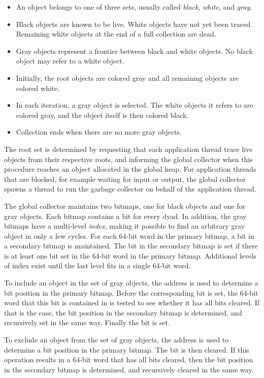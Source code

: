 \begin{itemize}
\item An object belongs to one of three sets, usually called
  \emph{black}, \emph{white}, and \emph{gray}.
\item Black objects are known to be live.  White objects have not yet
  been traced.  Remaining white objects at the end of a full
  collection are dead.
\item Gray objects represent a frontier between black and white
  objects.  No black object may refer to a white object.
\item Initially, the root objects are colored gray and all remaining
  objects are colored white.
\item In each iteration, a gray object is selected.  The white objects
  it refers to are colored gray, and the object itself is then colored
  black.
\item Collection ends when there are no more gray objects.
\end{itemize}

The root set is determined by requesting that each application thread
trace live objects from their respective roots, and informing the
global collector when this procedure reaches an object allocated in
the global heap. For application threads that are blocked, for example
waiting for input or output, the global collector spawns a thread to
run the garbage collector on behalf of the application thread.

The global collector maintains two bitmaps, one for black objects and
one for gray objects.  Each bitmap contains a bit for every dyad.  In
addition, the gray bitmaps have a multi-level \emph{index}, making it
possible to find an arbitrary gray object in only a few cycles.  For
each 64-bit word in the primary bitmap, a bit in a secondary bitmap is
maintained.  The bit in the secondary bitmap is set if there is at
least one bit set in the 64-bit word in the primary bitmap.
Additional levels of index exist until the last level fits in a single
64-bit word.

To include an object in the set of gray objects, the address is used
to determine a bit position in the primary bitmap.  Before the
corresponding bit is set, the 64-bit word that this bit is contained
in is tested to see whether it has all bits cleared.  If that is the
case, the bit position in the secondary bitmap is determined, and
recursively set in the same way.  Finally the bit is set.

To exclude an object from the set of gray objects, the address is used
to determine a bit position in the primary bitmap. The bit is then
cleared.  If this operation results in a 64-bit word that has all bits 
cleared, then the bit position in the
secondary bitmap is determined, and recursively cleared in the same
way.

